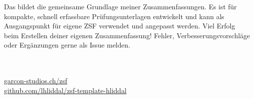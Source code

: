 
\begin{defbox}[][weight=quiet]
Das  bildet die gemeinsame Grundlage meiner Zusammenfassungen. Es ist für kompakte, schnell erfassbare Prüfungsunterlagen entwickelt und kann als Ausgangspunkt für eigene ZSF verwendet und angepasst werden. Viel Erfolg beim Erstellen deiner eigenen Zusammenfassung! Fehler, Verbesserungsvorschläge oder Ergänzungen gerne als Issue melden.

\ZSFgap[S]
\noindent{}\\
\\
\href{https://garcon-studios.ch/zsf}{garcon-studios.ch/zsf}\\
 \href{https://github.com/lhliddal/zsf-template-hliddal}{github.com/lhliddal/zsf-template-hliddal}
\end{defbox}
